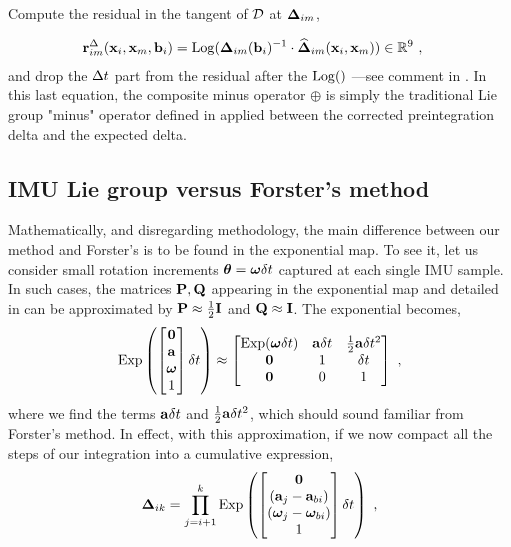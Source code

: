 Compute the residual in the  tangent of $\mathcal{D}$ at ${{\bm \Delta}}_{im}$,

\begin{align}
    {\bf r}^\Delta_{im}({\bf x}_i,{\bf x}_m,{\bf b}_i) &= \operatorname*{Log}({{\bm \Delta}}_{im}({\bf b}_i)^{-1} \cdot \widehat{{{\bm \Delta}}}_{im}({\bf x}_i,{\bf x}_m)) \in {\mathbb R}^9
~,
\end{align}
%
and drop the $\Delta t$ part from the residual after the $\operatorname*{Log}()$ ---see comment in .
In this last equation, the composite minus operator $\oplus$ is simply the traditional Lie group "minus" operator defined in \cite{sola2018micro} applied
between the corrected preintegration delta and the expected delta.



\subsection{IMU Lie group versus Forster's method}

Mathematically, and disregarding methodology, the main difference between our method and Forster's \cite{forster2017-TRO} is to be found in the exponential map. 
To see it, let us consider small rotation increments ${{\bm \theta}}={{\bm \omega}}\delta t$ captured at each single IMU sample. 
In such cases, the matrices ${\bf P},{\bf Q}$ appearing in the exponential map  and detailed in  can be approximated by ${\bf P}\approx\tfrac12{\bf I}$ and ${\bf Q}\approx{\bf I}$.
The exponential becomes,
%
\begin{align}
    \operatorname*{Exp}\left(\begin{bmatrix}
    \bf0 \\ {\bf a} \\ {{\bm \omega}} \\ 1
    \end{bmatrix}\delta t\right) \approx \begin{bmatrix}
    \operatorname*{Exp}({{\bm \omega}}\delta t) & {\bf a}\delta t & \tfrac12{\bf a}\delta t^2 \\
    \bf0 & 1 & \delta t \\
    \bf0 & 0 & 1
    \end{bmatrix}
~,
\end{align}
%
where we find the terms ${\bf a}\delta t$ and $\tfrac12{\bf a}\delta t^2$, which should sound familiar from Forster's method. 
In effect, with this approximation, if we now compact all the steps  of our integration into a cumulative expression,
%
\begin{align}
    {{\bm \Delta}}_{ik} = \prod_{j=i+1}^k \operatorname*{Exp}\left(\begin{bmatrix}
    \bf0 \\ ({\bf a}_j-{\bf a}_{bi}) \\ ({{\bm \omega}}_j-{{\bm \omega}}_{bi}) \\ 1
    \end{bmatrix}\delta t\right)
~,
\end{align}

